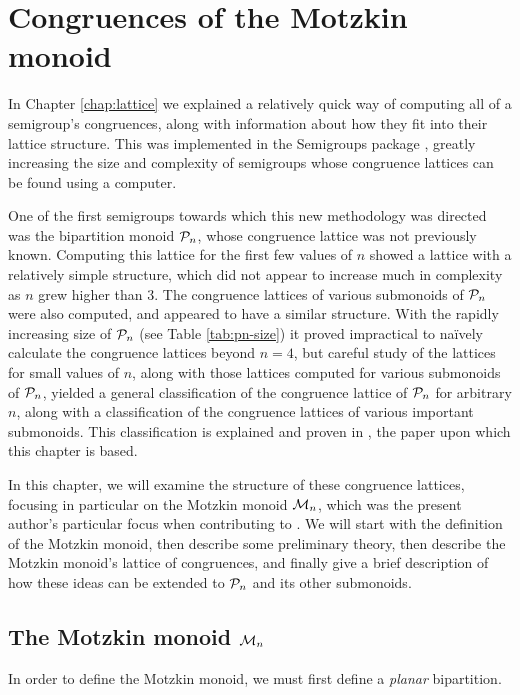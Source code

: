 \chapter{Congruences of the Motzkin monoid}
\label{chap:motzkin}

In Chapter \ref{chap:lattice} we explained a relatively quick way of computing
all of a semigroup's congruences, along with information about how they fit into
their lattice structure.  This was implemented in the Semigroups package
\cite{semigroups}, greatly increasing the size and complexity of semigroups
whose congruence lattices can be found using a computer.

One of the first semigroups towards which this new methodology was directed was
the bipartition monoid $\mathcal{P}_n$, whose congruence lattice was not previously
known.  Computing this lattice for the first few values of $n$ showed a lattice
with a relatively simple structure, which did not appear to increase much in
complexity as $n$ grew higher than $3$.  The congruence lattices of various
submonoids of $\mathcal{P}_n$ were also computed, and appeared to have a similar
structure.  With the rapidly increasing size of $\mathcal{P}_n$ (see Table
\ref{tab:pn-size}) it proved impractical to na\"ively calculate the congruence
lattices beyond $n=4$, but careful study of the lattices for small values of
$n$, along with those lattices computed for various submonoids of $\mathcal{P}_n$,
yielded a general classification of the congruence lattice of $\mathcal{P}_n$ for
arbitrary $n$, along with a classification of the congruence lattices of various
important submonoids.  This classification is explained and proven in
\cite{ourpaper}, the paper upon which this chapter is based.

In this chapter, we will examine the structure of these congruence lattices,
focusing in particular on the Motzkin monoid $\mathcal{M}_n$, which was the present
author's particular focus when contributing to \cite{ourpaper}.  We will start
with the definition of the Motzkin monoid, then describe some preliminary
theory, then describe the Motzkin monoid's lattice of congruences, and
finally give a brief description of how these ideas can be extended to $\mathcal{P}_n$
and its other submonoids.

\section{The Motzkin monoid $\mathcal{M}_n$}
\label{sec:motzkin-monoid}
In order to define the Motzkin monoid, we must first define a \textit{planar}
bipartition.

